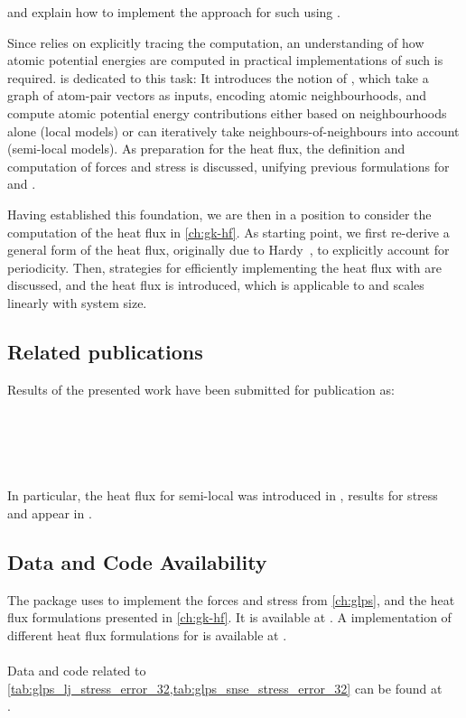  and explain how to implement the \gk{} approach for such \mlps{} using \ad{}.

Since \ad relies on explicitly tracing the  computation, an understanding of how atomic potential energies are computed in practical implementations of such \mlps is required.  is dedicated to this task: It introduces the notion of \glps, which take a graph of \mic atom-pair vectors as inputs, encoding atomic neighbourhoods, and compute atomic potential energy contributions either based on neighbourhoods alone (local models) or can iteratively take neighbours-of-neighbours into account (semi-local models). As preparation for the heat flux, the definition and computation of forces and stress is discussed, unifying previous formulations for \ffs and \mlps.

Having established this foundation, we are then in a position to consider the computation of the heat flux in \cref{ch:gk-hf}.
As starting point, we first re-derive a general form of the heat flux, originally due to Hardy~\cite{h1963t}, to explicitly account for periodicity.
Then, strategies for efficiently implementing the heat flux with \ad are discussed, and the  heat flux is introduced, which is applicable to \glps and scales linearly with system size.

\subsection{Related publications}
Results of the presented work have been submitted for publication as:
\\\\
\PaperHF
\\\\
\PaperGLP
\\\\
In particular, the heat flux for semi-local \mlps was introduced in \cite{lksr2023a}, results for stress and \glps appear in \cite{lfk2023a}.

\subsection{Data and Code Availability}
The \glpc package uses \jax to implement the forces and stress from \cref{ch:glps}, and the heat flux formulations presented in \cref{ch:gk-hf}. It is available at . A \pytorch implementation of different heat flux formulations for \schnetpack is available at .
\\\\
Data and code related to \cref{tab:glps_lj_stress_error_32,tab:glps_snse_stress_error_32} can be found at\\
.

